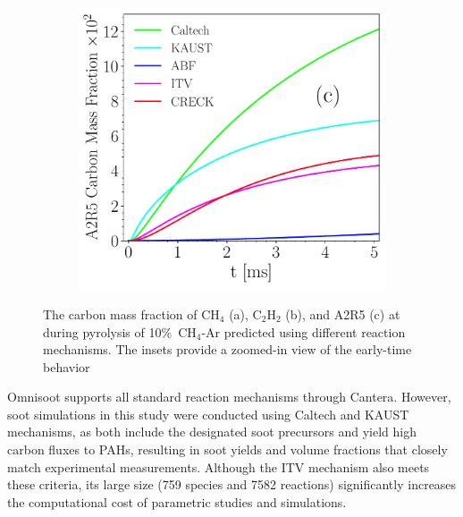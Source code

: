 \begin{figure}[H]
\begin{subfigure}[t]{0.31\textwidth}
	\end{subfigure}
	\begin{subfigure}[t]{0.31\textwidth}
		\includegraphics[width=1\textwidth]{Figures/Results/chemistry/A2R5.pdf}
	\end{subfigure}
	\caption{The carbon mass fraction of $\mathrm{CH_4}$ (a), $\mathrm{C_2H_2}$ (b), and A2R5 (c) at during pyrolysis of 10\%~$\mathrm{CH_4}$-Ar predicted using different reaction mechanisms. The insets provide a zoomed-in view of the early-time behavior}
	\label{fig:CH4_C2H4_A2R5_chem} 
\end{figure}

Omnisoot supports all standard reaction mechanisms through Cantera. However, soot simulations in this study were conducted using Caltech and KAUST mechanisms, as both include the designated soot precursors and yield high carbon fluxes to PAHs, resulting in soot yields and volume fractions that closely match experimental measurements. Although the ITV mechanism also meets these criteria, its large size (759 species and 7582 reactions) significantly increases the computational cost of parametric studies and simulations.

%
